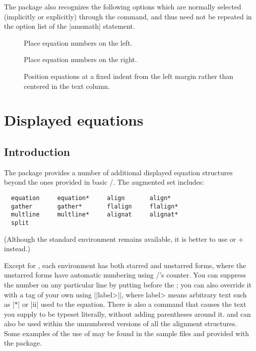 \documentclass[leqno,titlepage,openany]{amsldoc}[1999/12/13]
\begin{document}
The  package also recognizes the following options which
are normally selected (implicitly or explicitly) through the
 command, and thus need not be repeated in the option
list of the |{amsmath}| statement.
\begin{description}

\item[] Place equation numbers on the left.

\item[] Place equation numbers on the right.

\item[] Position equations at a fixed indent from the left
margin rather than centered in the text column.

\end{description}

\chapter{Displayed equations}

\section{Introduction}
The  package provides a number of additional displayed
equation structures beyond the ones
provided in basic \latex/. The augmented set includes:
\begin{verbatim}
  equation     equation*     align       align*
  gather       gather*       flalign     flalign*
  multline     multline*     alignat     alignat*
  split
\end{verbatim}
(Although the standard  environment remains available,
it is better to use  or + instead.)

Except for , each environment has both starred and unstarred
forms, where the unstarred forms have automatic numbering using
\latex/'s  counter. You can suppress the number on any
particular line by putting  before the \cn{\\}; you can also
override it with a tag of your own
using |{|\<label>|}|, where \<label> means arbitrary text such
as |$*$| or |ii| used to  the equation. There is also a
 command that causes the text you supply to be typeset
literally, without adding parentheses around it.  and 
can also be used within the unnumbered versions of all the 
alignment structures. Some examples of the use of  may be found
in the sample files  and  provided with
the  package.
\end{document}
